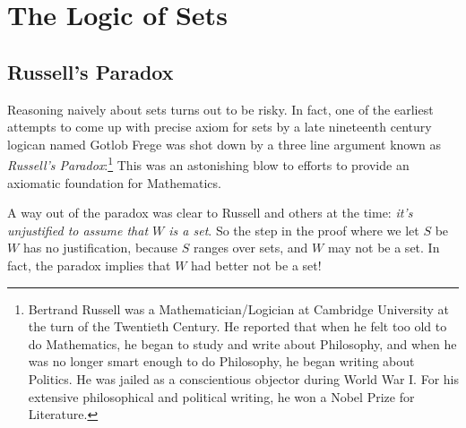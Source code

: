 \begin{problems}
\classproblems
{}
\homeworkproblems
{}
\end{problems}

\section{The Logic of Sets}

\subsection{Russell's Paradox}

Reasoning naively about sets turns out to be risky.  In fact, one of the
earliest attempts to come up with precise axiom for sets by a late
nineteenth century logican named Gotlob Frege was shot down by a three
line argument known as \emph{Russell's Paradox}:\footnote{Bertrand Russell
  was a Mathematician/Logician at Cambridge University at the turn of the
  Twentieth Century.  He reported that when he felt too old to do
  Mathematics, he began to study and write about Philosophy, and when he
  was no longer smart enough to do Philosophy, he began writing about
  Politics.  He was jailed as a conscientious objector during World War I.
  For his extensive philosophical and political writing, he won a Nobel
  Prize for Literature.}  This was an astonishing blow to efforts to
provide an axiomatic foundation for Mathematics.


A way out of the paradox was clear to Russell and others at the time:
\emph{it's unjustified to assume that $W$ is a set}.  So the step in the
proof where we let $S$ be $W$ has no justification, because $S$ ranges
over sets, and $W$ may not be a set.  In fact, the paradox implies that
$W$ had better not be a set!

